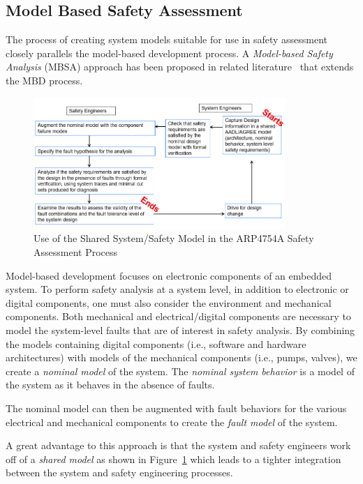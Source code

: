 \subsection{Model Based Safety Assessment}
\label{subsec:mbsa}
The process of creating system models suitable for use in safety assessment closely parallels the model-based development process. A \emph{Model-based Safety Analysis} (MBSA) approach has been proposed in related literature~\cite{Joshi05:Dasc, joshi2008behavioral, criticalembeddedsystems} that extends the MBD process. 

\begin{figure}[h]
	\centering
	\includegraphics[trim=0 5 0 5,clip,width=0.85\textwidth]{images/process4.png}
	\caption{Use of the Shared System/Safety Model in the ARP4754A Safety Assessment Process}
	\label{fig:proposed_safety_process}
\end{figure}

Model-based development focuses on electronic components of an embedded system. To perform safety analysis at a system level, in addition to electronic or digital components, one must also consider the environment and mechanical components. Both mechanical and electrical/digital components are necessary to model the system-level faults that are of interest in safety analysis. By combining the models containing digital components (i.e., software and hardware architectures) with models of the mechanical components (i.e., pumps, valves), we create a \emph{nominal model} of the system. The \emph{nominal system behavior} is a model of the system as it behaves in the absence of faults. 

The nominal model can then be augmented with fault behaviors for the various electrical and mechanical components to create the \emph{fault model} of the system. 

A great advantage to this approach is that the system and safety engineers work off of a \emph{shared model} as shown in Figure~\ref{fig:proposed_safety_process} which leads to a tighter integration between the system and safety engineering processes. 

